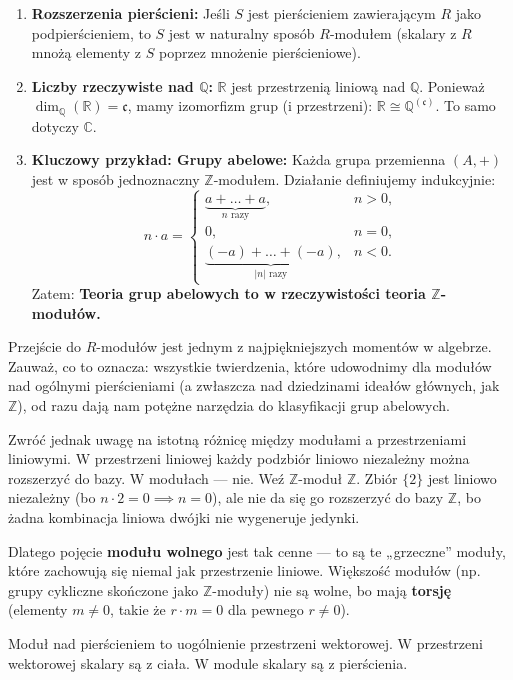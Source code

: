 \begin{remark}
\begin{enumerate}
\item \textbf{Rozszerzenia pierścieni:} Jeśli $S$ jest pierścieniem zawierającym $R$ jako podpierścieniem, to $S$ jest w naturalny sposób $R$-modułem (skalary z $R$ mnożą elementy z $S$ poprzez mnożenie pierścieniowe).
\item \textbf{Liczby rzeczywiste nad $\mathbb{Q}$:} $\mathbb{R}$ jest przestrzenią liniową nad $\mathbb{Q}$. Ponieważ $\dim_{\mathbb{Q}}(\mathbb{R}) = \mathfrak{c}$, mamy izomorfizm grup (i przestrzeni): $\mathbb{R} \cong \mathbb{Q}^{(\mathfrak{c})}$. To samo dotyczy $\mathbb{C}$.
\item \textbf{Kluczowy przykład: Grupy abelowe:} Każda grupa przemienna $(A, +)$ jest w sposób jednoznaczny $\mathbb{Z}$-modułem. Działanie definiujemy indukcyjnie:
\[
n \cdot a = \begin{cases}
\underbrace{a + \dots + a}_{n \text{ razy}}, & n > 0,\\
0, & n = 0,\\
\underbrace{(-a) + \dots + (-a)}_{|n| \text{ razy}}, & n < 0.
\end{cases}
\]
Zatem: \textbf{Teoria grup abelowych to w rzeczywistości teoria $\mathbb{Z}$-modułów.}
\end{enumerate}
\end{remark}

\begin{intuition}	
Przejście do $R$-modułów jest jednym z najpiękniejszych momentów w algebrze. Zauważ, co to oznacza: wszystkie twierdzenia, które udowodnimy dla modułów nad ogólnymi pierścieniami (a zwłaszcza nad dziedzinami ideałów głównych, jak $\mathbb{Z}$), od razu dają nam potężne narzędzia do klasyfikacji grup abelowych.

Zwróć jednak uwagę na istotną różnicę między modułami a przestrzeniami liniowymi. W przestrzeni liniowej każdy podzbiór liniowo niezależny można rozszerzyć do bazy. W modułach — nie. Weź $\mathbb{Z}$-moduł $\mathbb{Z}$. Zbiór $\{2\}$ jest liniowo niezależny (bo $n \cdot 2 = 0 \implies n=0$), ale nie da się go rozszerzyć do bazy $\mathbb{Z}$, bo żadna kombinacja liniowa dwójki nie wygeneruje jedynki.

Dlatego pojęcie \textbf{modułu wolnego} jest tak cenne — to są te „grzeczne” moduły, które zachowują się niemal jak przestrzenie liniowe. Większość modułów (np. grupy cykliczne skończone jako $\mathbb{Z}$-moduły) nie są wolne, bo mają \textbf{torsję} (elementy $m \neq 0$, takie że $r \cdot m = 0$ dla pewnego $r \neq 0$).

    Moduł nad pierścieniem to uogólnienie przestrzeni wektorowej. W przestrzeni wektorowej skalary są z ciała. W module skalary są z pierścienia.
\end{intuition}

